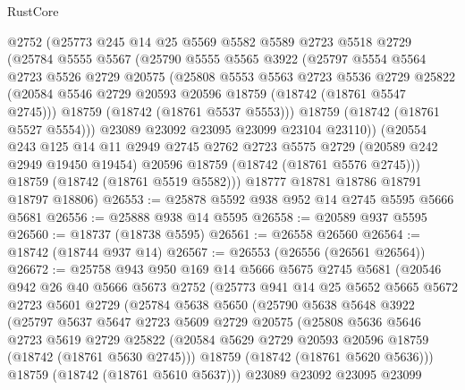\begin{lexlean}{RustCore}
\begin{coremodule}
      @2752
      (@25773
        @245
        @14
        @25
        @5569
        @5582
        @5589
        @2723
        @5518
        @2729
        (@25784
          @5555
          @5567
          (@25790
            @5555
            @5565
            @3922
            (@25797
              @5554
              @5564
              @2723
              @5526
              @2729
              @20575
              (@25808
                @5553
                @5563
                @2723
                @5536
                @2729
                @25822
                (@20584 @5546 @2729 @20593 @20596 @18759 (@18742 (@18761 @5547 @2745)))
                @18759
                (@18742 (@18761 @5537 @5553)))
              @18759
              (@18742 (@18761 @5527 @5554)))
            @23089
            @23092
            @23095
            @23099
            @23104
            @23110))
        (@20554
          @243
          @125
          @14
          @11
          @2949
          @2745
          @2762
          @2723
          @5575
          @2729
          (@20589 @242 @2949 @19450 @19454)
          @20596
          @18759
          (@18742 (@18761 @5576 @2745)))
        @18759
        (@18742 (@18761 @5519 @5582)))
      @18777
      @18781
      @18786
      @18791
      @18797
      @18806)
@26553 := @25878 @5592 @938 @952 @14 @2745 @5595 @5666 @5681
@26556 := @25888 @938 @14 @5595
@26558 := @20589 @937 @5595
@26560 := @18737 (@18738 @5595)
@26561 := @26558 @26560
@26564 := @18742 (@18744 @937 @14)
@26567 := @26553 (@26556 (@26561 @26564))
@26672 := @25758
    @943
    @950
    @169
    @14
    @5666
    @5675
    @2745
    @5681
    (@20546
      @942
      @26
      @40
      @5666
      @5673
      @2752
      (@25773
        @941
        @14
        @25
        @5652
        @5665
        @5672
        @2723
        @5601
        @2729
        (@25784
          @5638
          @5650
          (@25790
            @5638
            @5648
            @3922
            (@25797
              @5637
              @5647
              @2723
              @5609
              @2729
              @20575
              (@25808
                @5636
                @5646
                @2723
                @5619
                @2729
                @25822
                (@20584 @5629 @2729 @20593 @20596 @18759 (@18742 (@18761 @5630 @2745)))
                @18759
                (@18742 (@18761 @5620 @5636)))
              @18759
              (@18742 (@18761 @5610 @5637)))
            @23089
            @23092
            @23095
            @23099

\end{coremodule}
\end{lexlean}
